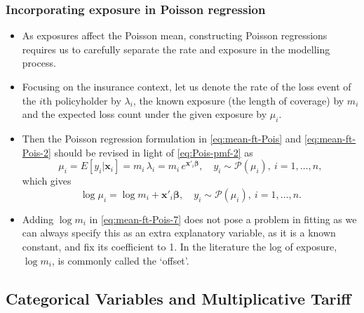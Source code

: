 \documentclass[ignorenonframetext,]{beamer}
\begin{document}
\begin{frame}[allowframebreaks]
\frametitle{Incorporating exposure in Poisson regression}
\begin{itemize}
\item As exposures affect the Poisson mean, constructing Poisson regressions requires us to carefully separate the rate and exposure in the modelling process. 
\item Focusing on the insurance context, let us denote the rate of the loss event of the $i$th policyholder by $\lambda_i$, the known exposure (the length of coverage) by  $m_i$ and the expected loss count under the given exposure by $\mu_i$. 
\framebreak
\item Then the Poisson regression formulation in \eqref{eq:mean-ft-Pois} and \eqref{eq:mean-ft-Pois-2} should be revised in light of \eqref{eq:Pois-pmf-2} as
\begin{equation} \label{eq:mean-ft-Pois-6}
\mu_i=E{[y_i|\mathbf{ x}_i]}=m_i \,\lambda_i=m_i \, e^{\mathbf{ x}'_i \boldsymbol \beta}, \quad y_i \sim \mathcal{P}(\mu_i), \ i=1, \ldots, n,
\end{equation} 
which gives
\begin{equation} \label{eq:mean-ft-Pois-7}
\log \mu_i=\log m_i+\mathbf{ x}'_i \boldsymbol \beta, \quad y_i \sim \mathcal{P}(\mu_i), \ i=1, \ldots, n.
\end{equation}
\item Adding $\log m_i$ in \eqref{eq:mean-ft-Pois-7} does not pose a problem in fitting as we can always specify this as an extra explanatory variable, as it is a known constant, and fix its coefficient to 1. In the literature the log of exposure, $\log m_i$, is commonly called the `offset'.
\end{itemize}

\end{frame}

\subsection{Categorical Variables and Multiplicative Tariff}
\end{document}
